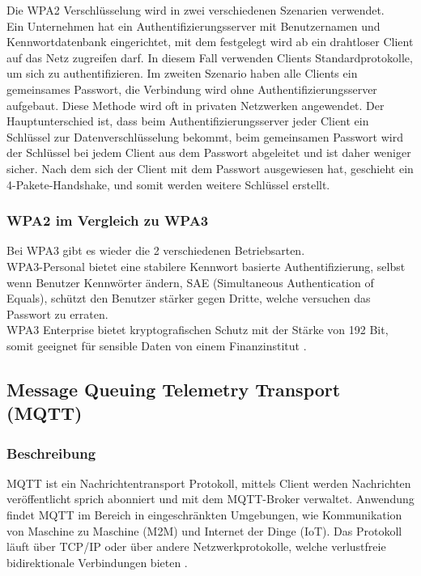 Die WPA2 Verschlüsselung wird in zwei verschiedenen Szenarien verwendet.\\
Ein Unternehmen hat ein Authentifizierungsserver mit Benutzernamen und Kennwortdatenbank eingerichtet, mit dem festgelegt wird ab ein drahtloser Client auf das Netz zugreifen darf. In diesem Fall verwenden Clients Standardprotokolle, um sich zu authentifizieren.
Im zweiten Szenario haben alle Clients ein gemeinsames Passwort, die Verbindung wird ohne Authentifizierungsserver aufgebaut. Diese Methode wird oft in privaten Netzwerken angewendet. Der Hauptunterschied ist, dass beim Authentifizierungsserver jeder Client ein Schlüssel zur Datenverschlüsselung bekommt, beim gemeinsamen Passwort wird der Schlüssel bei jedem Client aus dem Passwort abgeleitet und ist daher weniger sicher.
Nach dem sich der Client mit dem Passwort ausgewiesen hat, geschieht ein 4-Pakete-Handshake, und somit werden weitere Schlüssel erstellt.  
\subsubsection{WPA2 im Vergleich zu WPA3}
Bei WPA3 gibt es wieder die 2 verschiedenen Betriebsarten.\\
WPA3-Personal bietet eine stabilere Kennwort basierte Authentifizierung, selbst wenn Benutzer Kennwörter ändern, SAE (Simultaneous Authentication of Equals), schützt den Benutzer stärker gegen Dritte, welche versuchen das Passwort zu erraten.\\
WPA3 Enterprise bietet kryptografischen Schutz mit der Stärke von 192 Bit, somit geeignet für sensible Daten von einem Finanzinstitut \cite{noauthor_wi-fi_nodate}.























\newpage
\subsection{Message Queuing Telemetry Transport (MQTT)}
\subsubsection{Beschreibung}
MQTT ist ein Nachrichtentransport Protokoll, mittels Client werden Nachrichten veröffentlicht sprich abonniert und mit dem MQTT-Broker verwaltet. Anwendung findet MQTT im Bereich in eingeschränkten Umgebungen, wie Kommunikation von Maschine zu Maschine (M2M) und Internet der Dinge (IoT). Das Protokoll läuft über TCP/IP oder über andere Netzwerkprotokolle, welche verlustfreie bidirektionale Verbindungen bieten \cite{noauthor_mqtt-v5.0.pdf_nodate}. 

